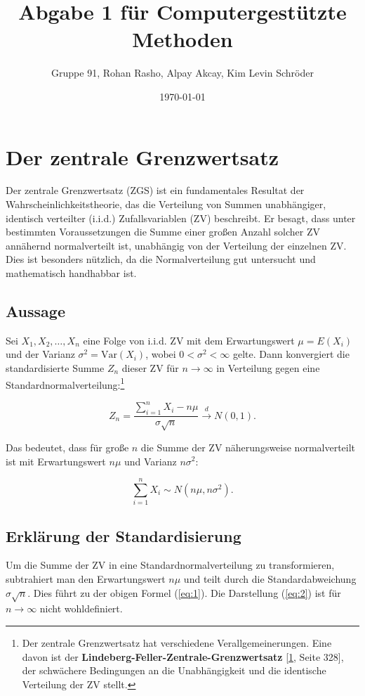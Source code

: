 \documentclass[a4paper,12pt]{article}
\title{Abgabe 1 für Computergestützte Methoden}
\author{Gruppe 91, Rohan Rasho, Alpay Akcay, Kim Levin Schröder}
\date{\today}
\begin{document}
\newpage
\maketitle

\renewcommand{\contentsname}{Inhaltsangabe}
\tableofcontents
\newpage

\section{Der zentrale Grenzwertsatz}
Der zentrale Grenzwertsatz (ZGS) ist ein fundamentales Resultat der Wahrscheinlichkeitstheorie, das die Verteilung von Summen unabhängiger, identisch verteilter (i.i.d.) Zufallsvariablen (ZV) beschreibt. Er besagt, dass unter bestimmten Voraussetzungen die Summe einer großen Anzahl solcher ZV annähernd normalverteilt ist, unabhängig von der Verteilung der einzelnen ZV. Dies ist besonders nützlich, da die Normalverteilung gut untersucht und mathematisch handhabbar ist.

\subsection{Aussage}
Sei $X_1, X_2, \dots, X_n$ eine Folge von i.i.d. ZV mit dem Erwartungswert $\mu = E(X_i)$ und der Varianz $\sigma^2 = \text{Var}(X_i)$, wobei $0 < \sigma^2 < \infty$ gelte. Dann konvergiert die standardisierte Summe $Z_n$ dieser ZV für $n \to \infty$ in Verteilung gegen eine Standardnormalverteilung:\footnote{Der zentrale Grenzwertsatz hat verschiedene Verallgemeinerungen. Eine davon ist der \textbf{Lindeberg-Feller-Zentrale-Grenzwertsatz} [\hyperlink{source1}{1}, Seite 328], der schwächere Bedingungen an die Unabhängigkeit und die identische Verteilung der ZV stellt.}

\begin{equation}
Z_n = \frac{\sum_{i=1}^n X_i - n\mu}{\sigma \sqrt{n}} \xrightarrow{d} N(0, 1).
\label{eq:1}
\end{equation}

\noindent Das bedeutet, dass für große $n$ die Summe der ZV näherungsweise normalverteilt ist mit Erwartungswert $n\mu$ und Varianz $n\sigma^2$:

\begin{equation}
\sum_{i=1}^n X_i \sim N(n\mu, n\sigma^2).
\label{eq:2}
\end{equation}

\subsection{Erklärung der Standardisierung}
Um die Summe der ZV in eine Standardnormalverteilung zu transformieren, subtrahiert man den Erwartungswert $n\mu$ und teilt durch die Standardabweichung $\sigma \sqrt{n}$. Dies führt zu der obigen Formel (\ref{eq:1}). Die Darstellung (\ref{eq:2}) ist für $n \to \infty$ nicht wohldefiniert.
\end{document}
